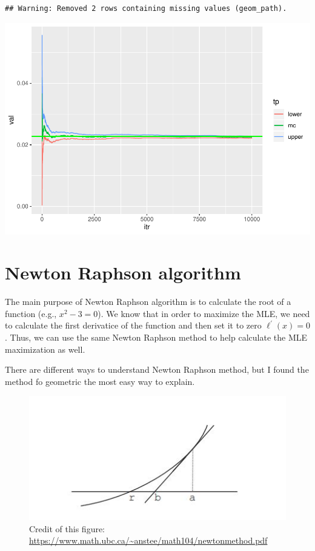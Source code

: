 \documentclass[]{book}
\begin{document}
\begin{verbatim}
## Warning: Removed 2 rows containing missing values (geom_path).
\end{verbatim}

\includegraphics{bookdown-demo_files/figure-latex/unnamed-chunk-22-1.pdf}

\section{Newton Raphson algorithm}\label{newton-raphson-algorithm}

The main purpose of Newton Raphson algorithm is to calculate the root of
a function (e.g., \(x^2-3=0\)). We know that in order to maximize the
MLE, we need to calculate the first derivatice of the function and then
set it to zero \(\ell^{'}(x)=0\). Thus, we can use the same Newton
Raphson method to help calculate the MLE maximization as well.

There are different ways to understand Newton Raphson method, but I
found the method fo geometric the most easy way to explain.

\begin{figure}
\centering
\includegraphics{Newton.jpg}
\caption{Credit of this figure:
\url{https://www.math.ubc.ca/~anstee/math104/newtonmethod.pdf}}
\end{figure}
\end{document}
